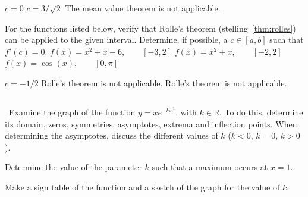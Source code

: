 \begin{Answer}\phantom{}
    \Question $c=0$ 
    \Question $c=3/\sqrt{2}$ 
    \Question The mean value theorem is not applicable.
   
\end{Answer}

\begin{Exercise} For the functions listed below, verify that Rolle's theorem (stelling~\ref{thm:rolles}) can be applied to the given interval. Determine, if possible, a $c \in [a,b]$ such that $f'(c)=0$. 
    \ifanalysis\Question[difficulty = 1]\fi \ifcalculus\Question[difficulty = 2]\fi $f(x) = x^2+x-6, \qquad [-3,2] $
    \ifanalysis\Question[difficulty = 1]\fi\ifcalculus\Question[difficulty = 2]\fi $f(x) = x^2+x, \qquad [-2,2] $ 
    \ifanalysis\Question[difficulty = 1]\fi\ifcalculus\Question[difficulty = 2]\fi $f(x) = \cos (x), \qquad [0,\pi] $ 

\end{Exercise}

\begin{Answer}\phantom{}
        \Question $c=-1/2$ 
        \Question Rolle's theorem is not applicable.
        \Question Rolle's theorem is not applicable.
\end{Answer}


\subsection*{}


\ifanalysis

\begin{Exercise}[difficulty = 2] %
\
    \Question Examine the graph of the function $y=x e^{-kx^2}$, with $k \in \mathbb{R}$. To do this, determine its domain, zeros, symmetries, asymptotes, extrema and inflection points. When determining the asymptotes, discuss the different values of $k$ ($k<0$, $k=0$, $k>0$).
    
    \Question Determine the value of the parameter $k$ such that a maximum occurs at $x=1$.
    
    \Question Make a sign table of the function and a sketch of the graph for the value of $k$.

\end{Exercise}

